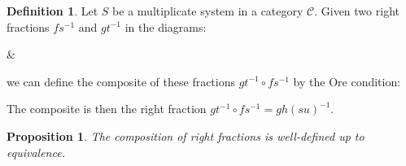 \documentclass[11pt]{article}
\newtheorem{prop}[theorem]{Proposition}
\theoremstyle{definition}
\newtheorem{definition}{Definition}[section]
\theoremstyle{remark}
\begin{document}
            \begin{definition}
                Let $S$ be a multiplicate system in a category $\mathcal{C}$. Given two right fractions $fs^{-1}$ and $gt^{-1}$ in the diagrams:
                \begin{center}
                    \&
                \end{center}
                we can define the composite of these fractions $gt^{-1}\circ fs^{-1}$ by the Ore condition:
                \begin{center}
                \end{center}
                The composite is then the right fraction $gt^{-1}\circ fs^{-1} = gh(su)^{-1}$.
            \end{definition}

            \begin{prop}
                The composition of right fractions is well-defined up to equivalence.
            \end{prop}
\end{document}
